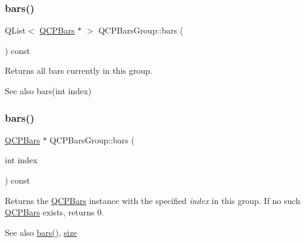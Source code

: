 \subsubsection{\texorpdfstring{bars()}{bars()}\hspace{0.1cm}{\footnotesize\ttfamily [1/2]}}
{\footnotesize\ttfamily Q\+List$<$ \mbox{\hyperlink{class_q_c_p_bars}{Q\+C\+P\+Bars}} $\ast$ $>$ Q\+C\+P\+Bars\+Group\+::bars (\begin{DoxyParamCaption}{ }\end{DoxyParamCaption}) const\hspace{0.3cm}{\ttfamily [inline]}}

Returns all bars currently in this group.

\begin{DoxySeeAlso}{See also}
bars(int index) 
\end{DoxySeeAlso}
\mbox{\label{class_q_c_p_bars_group_a0754d659a020aa7fddfe81e657ce2d92}} 
\subsubsection{\texorpdfstring{bars()}{bars()}\hspace{0.1cm}{\footnotesize\ttfamily [2/2]}}
{\footnotesize\ttfamily \mbox{\hyperlink{class_q_c_p_bars}{Q\+C\+P\+Bars}} $\ast$ Q\+C\+P\+Bars\+Group\+::bars (\begin{DoxyParamCaption}\item[{int}]{index }\end{DoxyParamCaption}) const}

Returns the \mbox{\hyperlink{class_q_c_p_bars}{Q\+C\+P\+Bars}} instance with the specified {\itshape index} in this group. If no such \mbox{\hyperlink{class_q_c_p_bars}{Q\+C\+P\+Bars}} exists, returns 0.

\begin{DoxySeeAlso}{See also}
\mbox{\hyperlink{class_q_c_p_bars_group_a6e4f4e86abbec6a9342f204ef82abef8}{bars()}}, \mbox{\hyperlink{class_q_c_p_bars_group_a3780ec77919cb00840207ec7a0f00dd5}{size}} 
\end{DoxySeeAlso}
\mbox{\label{class_q_c_p_bars_group_a3ddf23928c6cd89530bd34ab7ba7b177}} 
